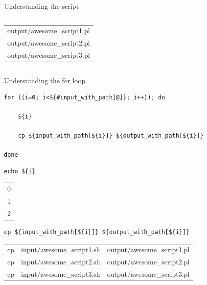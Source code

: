 \documentclass[t,10pt]{beamer}
\begin{document}
\begin{frame}[fragile,label={sec:orgheadline24}]{Understanding the script}
\begin{columns}
\begin{column}{0.5\columnwidth}
\begin{center}
\begin{tabular}{l}
output/awesome\_script1.pl\\
output/awesome\_script2.pl\\
output/awesome\_script3.pl\\
\end{tabular}
\end{center}
\end{column}
\end{columns}
\end{frame}

\begin{frame}[fragile,label={sec:orgheadline25}]{Understanding the for loop}
 \lstset{language=sh,label= ,caption= ,captionpos=b,numbers=none}
\begin{lstlisting}
for ((i=0; i<${#input_with_path[@]}; i++)); do

    ${i}

    cp ${input_with_path[${i}]} ${output_with_path[${i}]} 

done
\end{lstlisting}

\lstset{language=sh,label= ,caption= ,captionpos=b,numbers=none}
\begin{lstlisting}
echo ${i}
\end{lstlisting}

\begin{center}
\begin{tabular}{r}
0\\
1\\
2\\
\end{tabular}
\end{center}

\lstset{language=sh,label= ,caption= ,captionpos=b,numbers=none}
\begin{lstlisting}
cp ${input_with_path[${i}]} ${output_with_path[${i}]}
\end{lstlisting}

\begin{center}
\begin{tabular}{lll}
cp & input/awesome\_script1.sh & output/awesome\_script1.pl\\
cp & input/awesome\_script2.sh & output/awesome\_script2.pl\\
cp & input/awesome\_script3.sh & output/awesome\_script3.pl\\
\end{tabular}
\end{center}
\end{frame}
\end{document}
